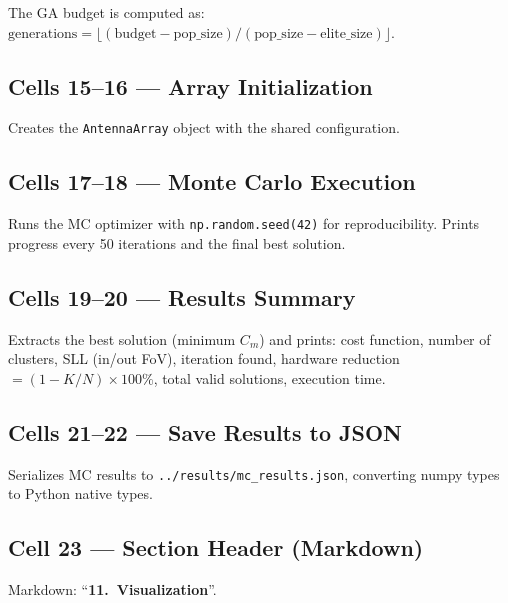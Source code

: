 \documentclass[11pt,a4paper]{article}
\begin{document}
The GA budget is computed as:
$\text{generations} = \lfloor(\text{budget} - \text{pop\_size}) / (\text{pop\_size} - \text{elite\_size})\rfloor$.

\subsection{Cells 15--16 --- Array Initialization}

Creates the \texttt{AntennaArray} object with the shared configuration.

\subsection{Cells 17--18 --- Monte Carlo Execution}

Runs the MC optimizer with \texttt{np.random.seed(42)} for reproducibility.
Prints progress every 50 iterations and the final best solution.

\subsection{Cells 19--20 --- Results Summary}

Extracts the best solution (minimum $C_m$) and prints:
cost function, number of clusters, SLL (in/out FoV), iteration found,
hardware reduction $= (1 - K/N) \times 100\%$, total valid solutions, execution time.

\subsection{Cells 21--22 --- Save Results to JSON}

Serializes MC results to \texttt{../results/mc\_results.json}, converting numpy
types to Python native types.

\subsection{Cell 23 --- Section Header (Markdown)}
Markdown: ``\textbf{11.\ Visualization}''.
\end{document}
